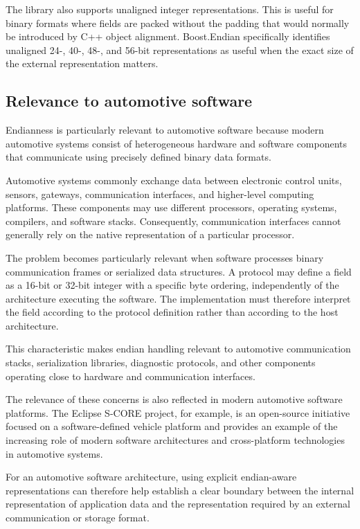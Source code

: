 The library also supports unaligned integer representations. 
This is useful for binary formats where fields are packed without the padding that would normally be introduced by C++ object alignment. 
Boost.Endian specifically identifies unaligned 24-, 40-, 48-, and 56-bit representations as useful 
when the exact size of the external representation matters.

\subsection{Relevance to automotive software}

Endianness is particularly relevant to automotive software because modern automotive systems consist of heterogeneous hardware 
and software components that communicate using precisely defined binary data formats.

Automotive systems commonly exchange data between electronic control units, sensors, gateways, communication interfaces, 
and higher-level computing platforms. These components may use different processors, operating systems, compilers, and software stacks. 
Consequently, communication interfaces cannot generally rely on the native representation of a particular processor.

The problem becomes particularly relevant when software processes binary communication frames or serialized data structures. 
A protocol may define a field as a 16-bit or 32-bit integer with a specific byte ordering, 
independently of the architecture executing the software. 
The implementation must therefore interpret the field according to the protocol definition rather than according to the host architecture.

This characteristic makes endian handling relevant to automotive communication stacks, serialization libraries, diagnostic protocols, 
and other components operating close to hardware and communication interfaces.

The relevance of these concerns is also reflected in modern automotive software platforms. 
The Eclipse S-CORE project, for example, is an open-source initiative focused on a software-defined vehicle platform 
and provides an example of the increasing role of modern software architectures and cross-platform technologies in automotive systems.

For an automotive software architecture, using explicit endian-aware representations can therefore help establish a clear boundary 
between the internal representation of application data and the representation required by an external communication or storage format.


